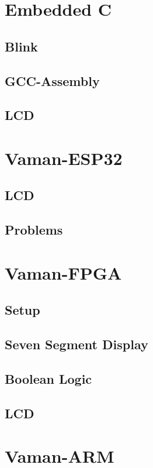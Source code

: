 \documentclass[11pt]{book}
\begin{document}
\chapter{Embedded C}
\section{Blink}



\section{GCC-Assembly}

\section{LCD}

%
\chapter{Vaman-ESP32}


\section{LCD}

\section{Problems}

\chapter{Vaman-FPGA}
\section{Setup}

\section{Seven Segment Display}

\section{Boolean Logic}

\section{LCD}

\chapter{Vaman-ARM}
\end{document}
